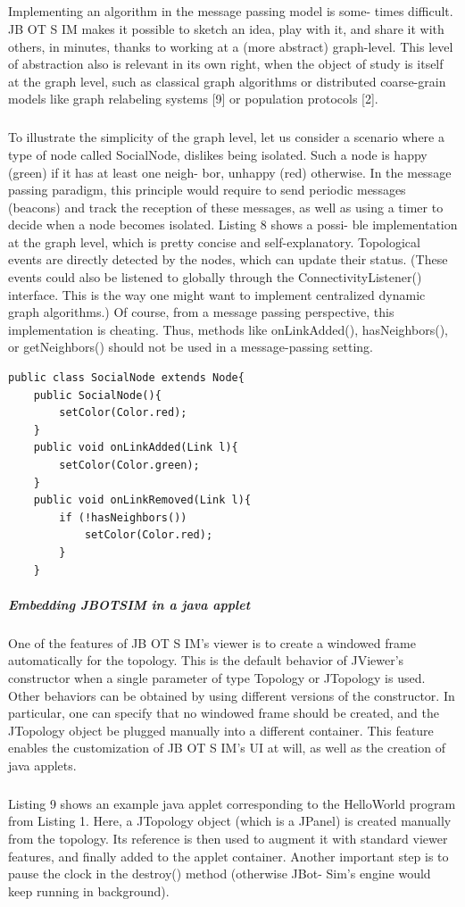 \subparagraph{}Implementing an algorithm in the message passing model is some- times difficult. JB OT S IM makes it possible to sketch an idea, play with it, and share it with others, in minutes, thanks to working at a (more abstract) graph-level. This level of abstraction also is relevant in its own right, when the object of study is itself at the graph level, such as classical graph algorithms or distributed coarse-grain models like graph relabeling systems [9] or population protocols [2].
\subparagraph{}To illustrate the simplicity of the graph level, let us consider a scenario where a type of node called SocialNode, dislikes being isolated. Such a node is happy (green) if it has at least one neigh- bor, unhappy (red) otherwise. In the message passing paradigm, this principle would require to send periodic messages (beacons) and track the reception of these messages, as well as using a timer to decide when a node becomes isolated. Listing 8 shows a possi- ble implementation at the graph level, which is pretty concise and self-explanatory. Topological events are directly detected by the nodes, which can update their status. (These events could also be listened to globally through the ConnectivityListener() interface. This is the way one might want to implement centralized dynamic graph algorithms.) Of course, from a message passing perspective, this implementation is cheating. Thus, methods like onLinkAdded(), hasNeighbors(), or getNeighbors() should not be used in a message-passing setting.

\begin{lstlisting}[caption=Example of graph-based algorithm, captionpos=b]
public class SocialNode extends Node{
	public SocialNode(){
		setColor(Color.red);
	}
	public void onLinkAdded(Link l){
		setColor(Color.green);
	}
	public void onLinkRemoved(Link l){
		if (!hasNeighbors())
			setColor(Color.red);
		}
	}
\end{lstlisting}
\subparagraph{Embedding JBOTSIM in a java applet}One of the features of JB OT S IM’s viewer is to create a windowed frame automatically for the topology. This is the default behavior of JViewer’s constructor when a single parameter of type Topology or JTopology is used. Other behaviors can be obtained by using different versions of the constructor. In particular, one can specify that no windowed frame should be created, and the JTopology object be plugged manually into a different container. This feature enables the customization of JB OT S IM’s UI at will, as well as the creation of java applets.
\subparagraph{}Listing 9 shows an example java applet corresponding to the HelloWorld program from Listing 1. Here, a JTopology object (which is a JPanel) is created manually from the topology. Its reference is then used to augment it with standard viewer features, and finally added to the applet container. Another important step is to pause the clock in the destroy() method (otherwise JBot- Sim’s engine would keep running in background).

